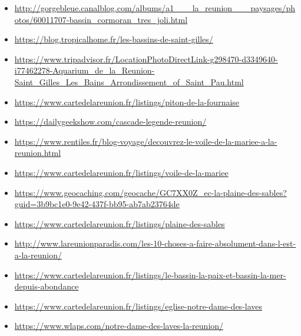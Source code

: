 \documentclass{article}
\begin{document}
\begin{itemize}
\item \url{http://gorgebleue.canalblog.com/albums/a1___la_reunion___paysages/photos/60011707-bassin_cormoran_tres_joli.html}
\item \url{https://blog.tropicalhome.fr/les-bassins-de-saint-gilles/}
\item \url{https://www.tripadvisor.fr/LocationPhotoDirectLink-g298470-d3349640-i77462278-Aquarium_de_la_Reunion-Saint_Gilles_Les_Bains_Arrondissement_of_Saint_Pau.html}
\item \url{https://www.cartedelareunion.fr/listings/piton-de-la-fournaise}
\item \url{https://dailygeekshow.com/cascade-legende-reunion/}
\item \url{https://www.rentiles.fr/blog-voyage/decouvrez-le-voile-de-la-mariee-a-la-reunion.html}
\item \url{https://www.cartedelareunion.fr/listings/voile-de-la-mariee}
\item \url{https://www.geocaching.com/geocache/GC7XX0Z_ec-la-plaine-des-sables?guid=3b9bc1e0-9e42-437f-bb95-ab7ab23764de}
\item \url{https://www.cartedelareunion.fr/listings/plaine-des-sables}
\item \url{http://www.lareunionparadis.com/les-10-choses-a-faire-absolument-dans-l-est-a-la-reunion/}
\item \url{https://www.cartedelareunion.fr/listings/le-bassin-la-paix-et-bassin-la-mer-depuis-abondance}
\item \url{https://www.cartedelareunion.fr/listings/eglise-notre-dame-des-laves}
\item \url{https://www.wlaps.com/notre-dame-des-laves-la-reunion/}

\end{itemize}
\end{document}
